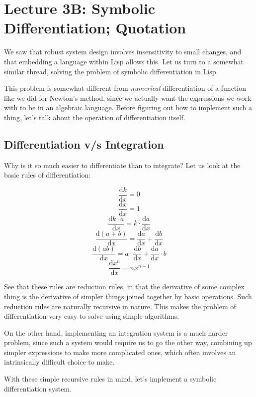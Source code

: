 \documentclass[9pt]{report}
\begin{document}
\chapter{Lecture 3B: Symbolic Differentiation; Quotation}
\label{sec:org89db303}

We saw that robust system design involves insensitivity to small
changes, and that embedding a language within Lisp allows this. Let
us turn to a somewhat similar thread, solving the problem of
symbolic differentiation in Lisp.

This problem is somewhat different from \emph{numerical} differentiation
of a function like we did for Newton's method, since we actually
want the expressions we work with to be in an algebraic language.
Before figuring out how to implement such a thing, let's talk about
the operation of differentiation itself.

\section{Differentiation v/s Integration}
\label{sec:org8d74c41}

Why is it so much easier to differentiate than to integrate?
Let us look at the basic rules of differentiation:

$$\frac{\mathrm{d}k}{\mathrm{d}x} = 0$$
$$\frac{\mathrm{d}x}{\mathrm{d}x} = 1$$
$$\frac{\mathrm{d}k\cdot a}{\mathrm{d}x} = k\cdot \frac{\mathrm{d}a}{\mathrm{d}x}$$
$$\frac{\mathrm{d}(a+b)}{\mathrm{d}x} =
   \frac{\mathrm{d}a}{\mathrm{d}x} + \frac{\mathrm{d}b}{\mathrm{d}x}$$
$$\frac{\mathrm{d}(ab)}{\mathrm{d}x} =  a\cdot
   \frac{\mathrm{d}b}{\mathrm{d}x} +
   \frac{\mathrm{d}a}{\mathrm{d}x}\cdot b$$
$$\frac{\mathrm{d}x^{n}}{\mathrm{d}x} = nx^{n-1}$$

See that these rules are reduction rules, in that the derivative of
some complex thing is the derivative of simpler things joined
together by basic operations. Such reduction rules are naturally
recursive in nature. This makes the problem of differentiation very
easy to solve using simple algorithms.

On the other hand, implementing an integration system is a much
harder problem, since such a system would require us to go the
other way, combining up simpler expressions to make more
complicated ones, which often involves an intrinsically difficult
choice to make.

With these simple recursive rules in mind, let's implement a
symbolic differentiation system.
\end{document}
